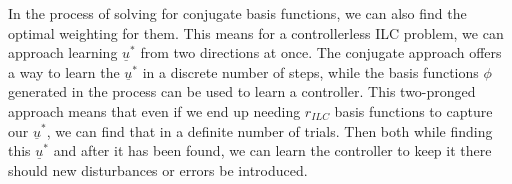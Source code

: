 In the process of solving for conjugate basis functions, we can also find the optimal weighting for them. This means for a controllerless ILC problem, we can approach learning $\underline{u}^\ast$ from two directions at once. The conjugate approach offers a way to learn the $\underline{u}^\ast$ in a discrete number of steps, while the basis functions $\phi$ generated in the process can be used to learn a controller. This two-pronged approach means that even if we end up needing $r_{ILC}$ basis functions to capture our $\underline{u}^\ast$, we can find that in a definite number of trials. Then both while finding this $\underline{u}^\ast$ and after it has been found, we can learn the controller to keep it there should new disturbances or errors be introduced.